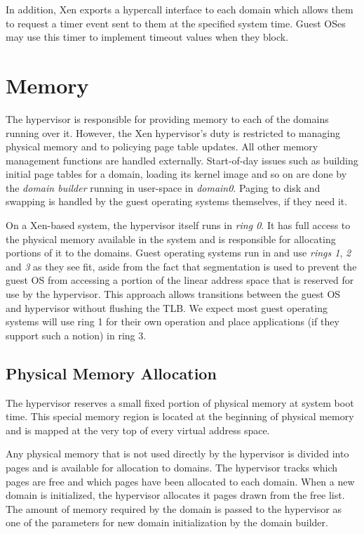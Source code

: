 \documentclass[11pt,twoside,final,openright]{xenstyle}
\begin{document}
In addition, Xen exports a hypercall interface to each domain which allows
them to request a timer event sent to them at the specified system
time.  Guest OSes may use this timer to implement timeout values when they
block.


\chapter{Memory}

The hypervisor is responsible for providing memory to each of the
domains running over it.  However, the Xen hypervisor's duty is
restricted to managing physical memory and to policying page table
updates.  All other memory management functions are handled
externally.  Start-of-day issues such as building initial page tables
for a domain, loading its kernel image and so on are done by the {\it
domain builder} running in user-space in {\it domain0}.  Paging to
disk and swapping is handled by the guest operating systems
themselves, if they need it.

On a Xen-based system, the hypervisor itself runs in {\it ring 0}.  It
has full access to the physical memory available in the system and is
responsible for allocating portions of it to the domains.  Guest
operating systems run in and use {\it rings 1}, {\it 2} and {\it 3} as
they see fit, aside from the fact that segmentation is used to prevent
the guest OS from accessing a portion of the linear address space that
is reserved for use by the hypervisor.  This approach allows
transitions between the guest OS and hypervisor without flushing the
TLB.  We expect most guest operating systems will use ring 1 for their
own operation and place applications (if they support such a notion)
in ring 3.

\section{Physical Memory Allocation}

The hypervisor reserves a small fixed portion of physical memory at
system boot time.  This special memory region is located at the
beginning of physical memory and is mapped at the very top of every
virtual address space.

Any physical memory that is not used directly by the hypervisor is divided into
pages and is available for allocation to domains.  The hypervisor tracks which
pages are free and which pages have been allocated to each domain.  When a new
domain is initialized, the hypervisor allocates it pages drawn from the free 
list.  The amount of memory required by the domain is passed to the hypervisor
as one of the parameters for new domain initialization by the domain builder.
\end{document}
